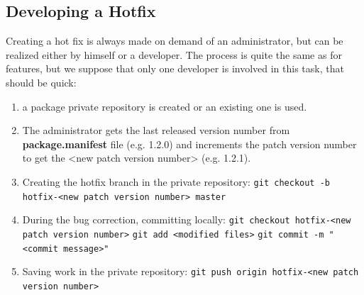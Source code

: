 \documentclass[12pt,a4paper]{article}
\begin{document}
\subsection{Developing a Hotfix}

Creating a hot fix is always made on demand of an administrator, but can be realized either by himself or a developer. The process is quite the same as for features, but we suppose that only one developer is involved in this task, that should be quick: 
\begin{enumerate}
\item a package private repository is created or an existing one is used.
\item The administrator gets the last released version number from \textbf{package.manifest} file (e.g. 1.2.0) and increments the patch version number to get the <new patch version number> (e.g. 1.2.1).
\item Creating the hotfix branch in the private repository:
\linebreak  \verb|git checkout -b hotfix-<new patch version number> master|
\item During the bug correction, committing locally:
\linebreak \verb|git checkout hotfix-<new patch version number>|
\linebreak \verb|git add <modified files>|
\linebreak \verb|git commit -m "<commit message>"|
\item Saving work in the private repository:
\linebreak \verb|git push origin hotfix-<new patch version number>|
\end{enumerate}
\end{document}
